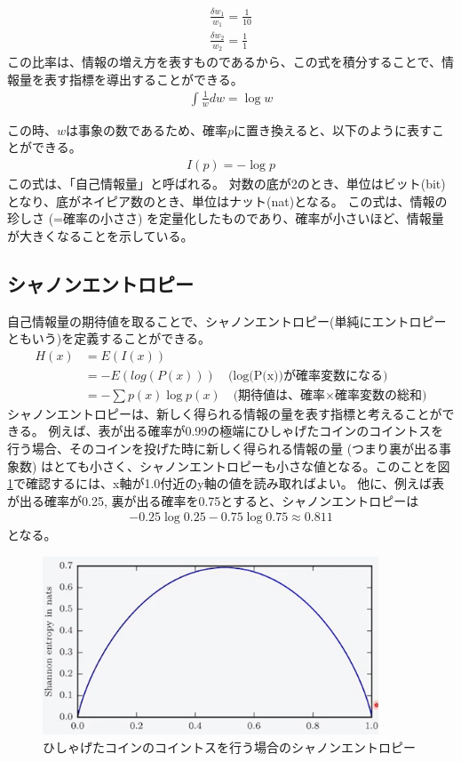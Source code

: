 \documentclass{ltjsarticle}
\begin{document}
\begin{align}
  \frac{\delta w_1}{w_1} = \frac{1}{10} \\
  \frac{\delta w_2}{w_2} = \frac{1}{1}
\end{align}
この比率は、情報の増え方を表すものであるから、この式を積分することで、情報量を表す指標を導出することができる。
\begin{align}
  \int \frac{1}{w} dw = \log w
\end{align}
\par
この時、$w$は事象の数であるため、確率$p$に置き換えると、以下のように表すことができる。
\begin{align}
  I(p) = - \log p
\end{align}
この式は、「自己情報量」と呼ばれる。
対数の底が2のとき、単位はビット(bit)となり、底がネイピア数のとき、単位はナット(nat)となる。
この式は、情報の珍しさ (=確率の小ささ) を定量化したものであり、確率が小さいほど、情報量が大きくなることを示している。

\subsection{シャノンエントロピー}
自己情報量の期待値を取ることで、シャノンエントロピー(単純にエントロピーともいう)を定義することができる。
\begin{align}
  H(x) &= E(I(x))\\
   &= -E(log(P(x))) \quad\text{(log(P(x))が確率変数になる)}\\
   &= - \sum p(x) \log p(x) \quad\text{(期待値は、確率×確率変数の総和)}
\end{align}
シャノンエントロピーは、新しく得られる情報の量を表す指標と考えることができる。
例えば、表が出る確率が0.99の極端にひしゃげたコインのコイントスを行う場合、そのコインを投げた時に新しく得られる情報の量 (つまり裏が出る事象数) はとても小さく、シャノンエントロピーも小さな値となる。このことを図\ref{fig:coin_shanon}で確認するには、x軸が1.0付近のy軸の値を読み取ればよい。
他に、例えば表が出る確率が0.25, 裏が出る確率を0.75とすると、シャノンエントロピーは
\begin{align}
  -0.25 \log 0.25 - 0.75 \log 0.75 \approx 0.811
\end{align}
となる。
\begin{figure}[htbp]
  \centering
  \includegraphics[width=10cm]{coin_shanon.png}
  \caption{ひしゃげたコインのコイントスを行う場合のシャノンエントロピー}
  \label{fig:coin_shanon}
\end{figure}
\end{document}
